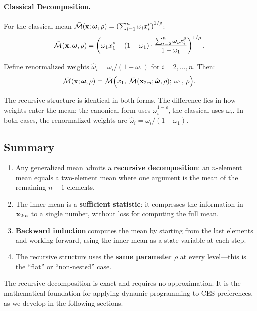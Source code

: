 \paragraph{Classical Decomposition.}
For the classical mean $\bar{\mathcal{M}}(\mathbf{x}; \boldsymbol{\omega}, \rho) = \left( \sum_{i=1}^{n} \omega_i x_i^\rho \right)^{1/\rho}$:
\begin{equation}
\bar{\mathcal{M}}(\mathbf{x}; \boldsymbol{\omega}, \rho) = \left( \omega_1 x_1^\rho + (1-\omega_1) \cdot \frac{\sum_{i=2}^{n} \omega_i x_i^\rho}{1-\omega_1} \right)^{1/\rho}.
\label{eq:classical-separate}
\end{equation}

Define renormalized weights $\hat{\omega}_i = \omega_i / (1-\omega_1)$ for $i = 2, \ldots, n$. Then:
\begin{equation}
\bar{\mathcal{M}}(\mathbf{x}; \boldsymbol{\omega}, \rho) = \bar{\mathcal{M}}\Big( x_1, \, \bar{\mathcal{M}}(\mathbf{x}_{2:n}; \hat{\boldsymbol{\omega}}, \rho); \; \omega_1, \, \rho \Big).
\label{eq:classical-recursive}
\end{equation}

\begin{calloutnote}
The recursive structure is identical in both forms. The difference lies in how weights enter the mean: the canonical form uses $\omega_i^{1-\rho}$, the classical uses $\omega_i$. In both cases, the renormalized weights are $\hat{\omega}_i = \omega_i / (1-\omega_1)$.
\end{calloutnote}

\subsection{Summary}
\label{subsec:recursion-summary}

\begin{calloutimportant}
\begin{enumerate}[label=(\roman*), leftmargin=2em]
    \item Any generalized mean admits a \textbf{recursive decomposition}: an $n$-element mean equals a two-element mean where one argument is the mean of the remaining $n-1$ elements.
    
    \item The inner mean is a \textbf{sufficient statistic}: it compresses the information in $\mathbf{x}_{2:n}$ to a single number, without loss for computing the full mean.
    
    \item \textbf{Backward induction} computes the mean by starting from the last elements and working forward, using the inner mean as a state variable at each step.
    
    \item The recursive structure uses the \textbf{same parameter $\rho$} at every level---this is the ``flat'' or ``non-nested'' case.
\end{enumerate}
\end{calloutimportant}

The recursive decomposition is exact and requires no approximation. It is the mathematical foundation for applying dynamic programming to CES preferences, as we develop in the following sections.

